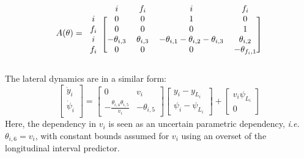 \documentclass{article}
\begin{document}
\begin{equation*}
A(\theta)
=
\begin{blockarray}{ccccc}
 & i & f_i & i & f_i \\
\begin{block}{c[cccc]}
i & 0 & 0 & 1 & 0 \\
f_i & 0 & 0 & 0 & 1 \\
i & -\theta_{i,3} & \theta_{i,3} & -\theta_{i,1}-\theta_{i,2}-\theta_{i,3} & \theta_{i,2} \\
f_i & 0 & 0 & 0 & -\theta_{f_i,1} \\
\end{block}
\end{blockarray}
\end{equation*}

The lateral dynamics are in a similar form:
\begin{equation*}
\begin{bmatrix}
\dot{y}_i \\
\dot{\psi}_i \\
\end{bmatrix}
=
\begin{bmatrix}
0 & v_i \\
-\frac{\theta_{i,4} \theta_{i,5}}{v_i} & -\theta_{i,5}
\end{bmatrix}
\begin{bmatrix}
y_i - y_{L_i} \\
\psi_i - \psi_{L_i}
\end{bmatrix}
+
\begin{bmatrix}
v_i\psi_{L_i} \\
0
\end{bmatrix}
\end{equation*}
Here, the dependency in $v_i$ is seen as an uncertain parametric dependency, \emph{i.e.} $\theta_{i,6}=v_i$, with constant bounds assumed for $v_i$ using an overset of the longitudinal interval predictor.
\end{document}
